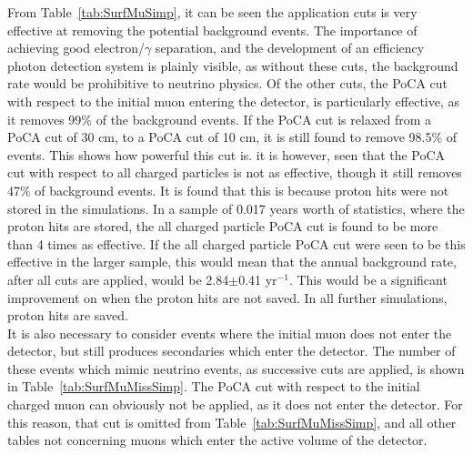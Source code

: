 From Table~\ref{tab:SurfMuSimp}, it can be seen the application cuts is very effective at removing the potential background events. The importance of achieving good electron/$\gamma$ separation, and the development of an efficiency photon detection system is plainly visible, as without these cuts, the background rate would be prohibitive to neutrino physics. Of the other cuts, the PoCA cut with respect to the initial muon entering the detector, is particularly effective, as it removes 99\% of the background events. If the PoCA cut is relaxed from a PoCA cut of 30 cm, to a PoCA cut of 10 cm, it is still found to remove 98.5\% of events. This shows how powerful this cut is. it is however, seen that the PoCA cut with respect to all charged particles is not as effective, though it still removes 47\% of background events. It is found that this is because proton hits were not stored in the simulations. In a sample of 0.017 years worth of statistics, where the proton hits are stored, the all charged particle PoCA cut is found to be more than 4 times as effective. If the all charged particle PoCA cut were seen to be this effective in the larger sample, this would mean that the annual background rate, after all cuts are applied, would be 2.84$\pm$0.41 yr$^{-1}$. This would be a significant improvement on when the proton hits are not saved. In all further simulations, proton hits are saved. \\

It is also necessary to consider events where the initial muon does not enter the detector, but still produces secondaries which enter the detector. The number of these events which mimic neutrino events, as successive cuts are applied, is shown in Table~\ref{tab:SurfMuMissSimp}. The PoCA cut with respect to the initial charged muon can obviously not be applied, as it does not enter the detector. For this reason, that cut is omitted from Table~\ref{tab:SurfMuMissSimp}, and all other tables not concerning muons which enter the active volume of the detector. \\

